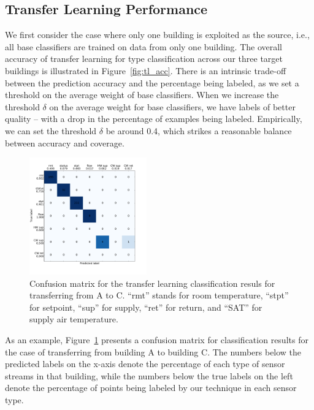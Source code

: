 \subsection{Transfer Learning Performance}

We first consider the case where only one building is exploited as the source, i.e., all base classifiers are trained on data from only one building.
The overall accuracy of transfer learning for type classification across our three target buildings is illustrated in Figure~\ref{fig:tl_acc}.
There is an intrinsic trade-off between the prediction accuracy and the percentage being labeled, as we set a threshold on the average weight of base classifiers.
When we increase the threshold $\delta$ on the average weight for base classifiers, we have labels of better quality -- with a drop in the percentage of examples being labeled.
Empirically, we can set the threshold $\delta$ be around 0.4, which strikes a reasonable balance between accuracy and coverage.

\begin{figure}[ht!]
                \centering
    \includegraphics[width=0.45\textwidth]{./fig/cm_single}
\caption{Confusion matrix for the transfer learning classification resuls for transferring from A to C. ``rmt'' stands for room temperature, ``stpt'' for setpoint, ``sup'' for supply, ``ret'' for return, and ``SAT'' for supply air temperature.
 }
\label{fig_cm}
\end{figure}

As an example, Figure~\ref{fig_cm} presents a confusion matrix for classification results for the case of transferring from building A to building C. The numbers below the predicted labels on the x-axis denote the percentage of each type of sensor streams in that building, while the numbers below the true labels on the left denote the percentage of points being labeled by our technique in each sensor type.


